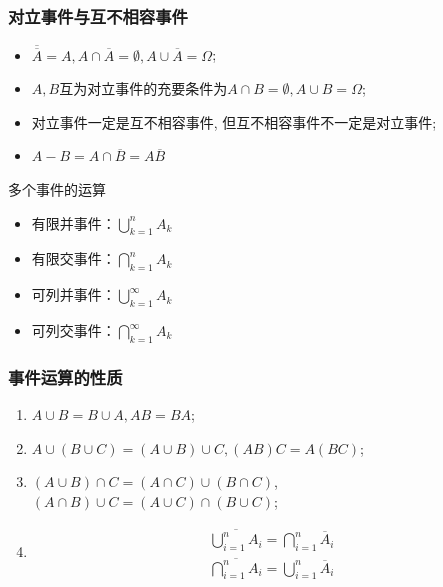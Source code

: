 \documentclass[Prob-All.tex]{subfiles}
\begin{document}
\begin{frame}
  \frametitle{对立事件与互不相容事件}
  \begin{itemize}[<+-|alert@+>]
  \item $\overline{\overline{A}}=A, A\cap \overline{A}=\emptyset, A\cup \overline{A}=\Omega$;
  \item $A,B$互为对立事件的充要条件为$A\cap B=\emptyset, A\cup B=\Omega$;
  \item 对立事件一定是互不相容事件, 但互不相容事件不一定是对立事件;
  \item $A-B=A\cap \overline{B}=A\overline{B}$
  \end{itemize}
\end{frame}

\begin{frame}{多个事件的运算}
	\begin{itemize}[<+-|alert@+>]

		\item 有限并事件：$\bigcup_{k=1}^{n}A_{k}$%
		\item 有限交事件：$\bigcap_{k=1}^{n}A_{k}$%
		\item 可列并事件：$\bigcup_{k=1}^{\infty}A_{k}$%
		\item 可列交事件：$\bigcap_{k=1}^{\infty}A_{k}$%
	\end{itemize}
\end{frame}


\begin{frame}
	\frametitle{事件运算的性质}
	\begin{enumerate}[<+-|alert@+>][(1)]
		\item {} $A\cup B=B\cup A, AB=BA$;
		\item {} $A\cup (B\cup C)=(A\cup B)\cup C, (AB)C=A(BC)$;
		\item {} $(A\cup B)\cap C=(A\cap C)\cup (B\cap C)$, \\\qquad \qquad $(A\cap B)\cup C=(A\cup C)\cap (B\cup C)$;
		\item {}
		\begin{eqnarray*}
			\overline{\bigcup_{i=1}^nA_i}=\bigcap_{i=1}^n \overline{A}_i\\
			\overline{\bigcap_{i=1}^nA_i}=\bigcup_{i=1}^n \overline{A}_i
		\end{eqnarray*}
	\end{enumerate}
\end{frame}
\end{document}
